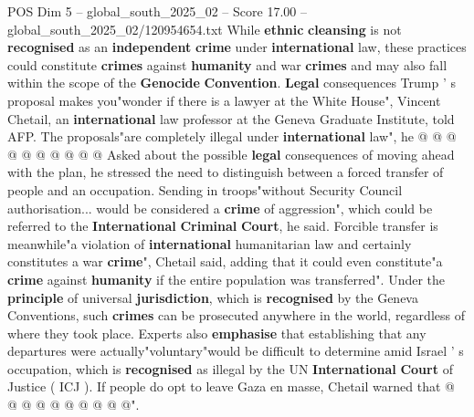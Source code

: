 \begin{textsample}{POS Dim 5 – global\_south\_2025\_02 – Score 17.00 – global\_south\_2025\_02/120954654.txt}
While \textbf{ethnic} \textbf{cleansing} is not \textbf{recognised} as an \textbf{independent} \textbf{crime} under \textbf{international} law, these practices could constitute \textbf{crimes} against \textbf{humanity} and war \textbf{crimes} and may also fall within the scope of the \textbf{Genocide} \textbf{Convention}. \textbf{Legal} consequences Trump ' s proposal makes you"wonder if there is a lawyer at the White House", Vincent Chetail, an \textbf{international} law professor at the Geneva Graduate Institute, told AFP.
The proposals"are completely illegal under \textbf{international} law", he @ @ @ @ @ @ @ @ @ @ Asked about the possible \textbf{legal} consequences of moving ahead with the plan, he stressed the need to distinguish between a forced transfer of people and an occupation.
Sending in troops"without Security Council authorisation... would be considered a \textbf{crime} of aggression", which could be referred to the \textbf{International} \textbf{Criminal} \textbf{Court}, he said.
Forcible transfer is meanwhile"a violation of \textbf{international} humanitarian law and certainly constitutes a war \textbf{crime}", Chetail said, adding that it could even constitute"a \textbf{crime} against \textbf{humanity} if the entire population was transferred".
Under the \textbf{principle} of universal \textbf{jurisdiction}, which is \textbf{recognised} by the Geneva Conventions, such \textbf{crimes} can be prosecuted anywhere in the world, regardless of where they took place.
Experts also \textbf{emphasise} that establishing that any departures were actually"voluntary"would be difficult to determine amid Israel ' s occupation, which is \textbf{recognised} as illegal by the UN \textbf{International} \textbf{Court} of Justice ( ICJ ).
If people do opt to leave Gaza en masse, Chetail warned that @ @ @ @ @ @ @ @ @ @".

\end{textsample}
